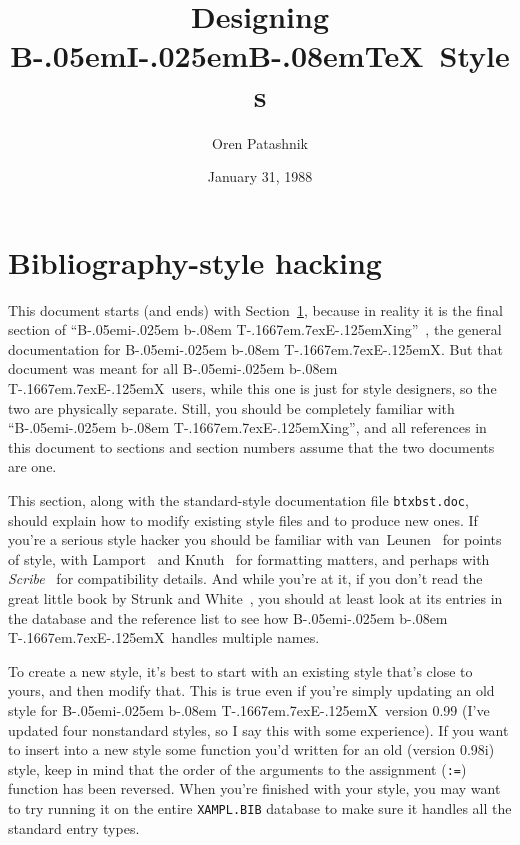 
\def\BibTeX{{\rm B\kern-.05em{\sc i\kern-.025em b}\kern-.08em
    T\kern-.1667em\lower.7ex\hbox{E}\kern-.125emX}}

\title{Designing B\kern-.05em{\large I}\kern-.025em{\large B}\kern-.08em\TeX\
									Styles}
\author{Oren Patashnik}
\date{January 31, 1988}



\maketitle

\setcounter{section}{4}
\section{Bibliography-style hacking}
\label{style}

This document starts (and ends) with Section~\ref{style},
because in reality it is the final section of ``\BibTeX ing''~\cite{btxdoc},
the general documentation for \BibTeX.
But that document was meant for all \BibTeX\ users,
while this one is just for style designers,
so the two are physically separate.
Still, you should be completely familiar with ``\BibTeX ing'',
and all references in this document
to sections and section numbers
assume that the two documents are one.

This section,
along with the standard-style documentation file \hbox{\tt btxbst.doc},
should explain how to modify
existing style files and to produce new ones.
If you're a serious style hacker you should be familiar
with van~Leunen~\cite{van-leunen} for points of style,
with Lamport~\cite{latex} and Knuth~\cite{texbook} for formatting matters,
and perhaps with {\em Scribe\/}~\cite{scribe} for compatibility details.
And while you're at it, if you don't read the great little book by Strunk and
White~\cite{strunk-and-white}, you should at least look at its
entries in the database and the reference list
to see how \BibTeX\ handles multiple names.

To create a new style,
it's best to start with an existing style that's close to yours,
and then modify that.
This is true even if you're simply updating an old style
for \BibTeX\ version 0.99
(I've updated four nonstandard styles,
so I say this with some experience).
If you want to insert into a new style
some function you'd written for an old (version 0.98i) style,
keep in mind that the order of the arguments to
the assignment ({\tt :=}) function has been reversed.
When you're finished with your style,
you may want to try running it on the entire \hbox{\tt XAMPL.BIB} database
to make sure it handles all the standard entry types.

